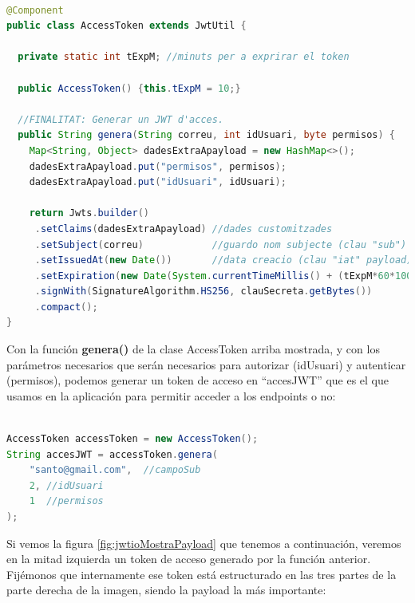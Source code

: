 \documentclass[a4paper,12pt]{report}
\begin{document}
		
\begin{lstlisting}[language=Java, basicstyle=\ttfamily\footnotesize, keywordstyle=\color{magenta}]
				
@Component
public class AccessToken extends JwtUtil {
	
  private static int tExpM; //minuts per a exprirar el token
	
  public AccessToken() {this.tExpM = 10;}
	
  //FINALITAT: Generar un JWT d'acces.
  public String genera(String correu, int idUsuari, byte permisos) {
	Map<String, Object> dadesExtraApayload = new HashMap<>();
	dadesExtraApayload.put("permisos", permisos);
	dadesExtraApayload.put("idUsuari", idUsuari);
		
	return Jwts.builder()
	 .setClaims(dadesExtraApayload) //dades customitzades
	 .setSubject(correu)            //guardo nom subjecte (clau "sub")
	 .setIssuedAt(new Date())       //data creacio (clau "iat" payload)
	 .setExpiration(new Date(System.currentTimeMillis() + (tExpM*60*1000)))
	 .signWith(SignatureAlgorithm.HS256, clauSecreta.getBytes())
	 .compact();
}


\end{lstlisting}
		
		
		
		Con la función \textbf{genera()} de la clase AccessToken arriba mostrada, y con los parámetros necesarios que serán necesarios para autorizar (idUsuari) y autenticar (permisos), podemos generar un token de acceso en ``accesJWT'' que es el que usamos en la aplicación para permitir acceder a los endpoints o no:
		
		
		
\begin{lstlisting}[language=Java, basicstyle=\ttfamily\footnotesize, keywordstyle=\color{magenta}]

AccessToken accessToken = new AccessToken();
String accesJWT = accessToken.genera(
	"santo@gmail.com",  //campoSub
	2, //idUsuari
	1  //permisos
);


\end{lstlisting}
		
		Si vemos la figura \ref{fig:jwtioMostraPayload} que tenemos a continuación, veremos en la mitad izquierda un token de acceso generado por la función anterior. Fijémonos que internamente ese token está estructurado en las tres partes de la parte derecha de la imagen, siendo la payload la más importante:
		
\end{document}
